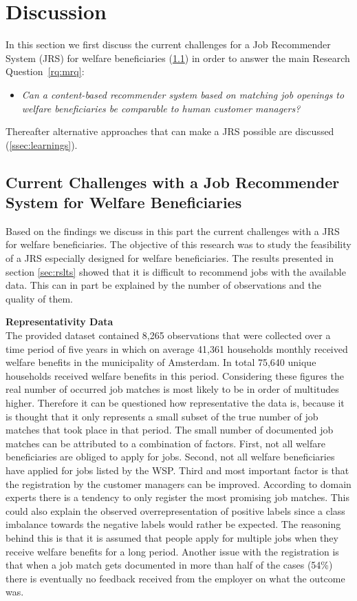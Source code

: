 \section{Discussion}
\label{sec:disc}
In this section we first discuss the current challenges for a Job Recommender System (JRS) for 
welfare beneficiaries (\ref{ssec:jrswb}) in order to answer the main Research Question~\ref{rq:mrq}: 
\begin{itemize}
	\item[] \em Can a content-based recommender system based on matching job openings to welfare beneficiaries be comparable to human customer managers?
\end{itemize}
Thereafter alternative approaches that can make a JRS possible are discussed (\ref{ssec:learnings}). 

\subsection{Current Challenges with a Job Recommender System for Welfare Beneficiaries}
\label{ssec:jrswb}
Based on the findings we discuss in this part the current challenges with a JRS for welfare beneficiaries.
The objective of this research was to study the feasibility of a JRS especially designed for welfare beneficiaries. 
The results presented in section \ref{sec:rslts} showed that it is difficult to recommend jobs with the available data.
This can in part be explained by the number of observations and the quality of them.

\noindent
\textbf{Representativity Data}\\
The provided dataset contained 8,265 observations that were collected over a time period of five years in which on average 41,361 households monthly received welfare benefits in the municipality of Amsterdam.
In total 75,640 unique households received welfare benefits in this period.
Considering these figures the real number of occurred job matches is most likely to be in order of multitudes higher.
Therefore it can be questioned how representative the data is, because it is thought that it only represents a small subset of the true number of job matches that took place in that period.  
The small number of documented job matches can be attributed to a combination of factors.
First, not all welfare beneficiaries are obliged to apply for jobs.
Second, not all welfare beneficiaries have applied for jobs listed by the WSP.
Third and most important factor is that the registration by the customer managers can be improved.
According to domain experts there is a tendency to only register the most promising job matches.
This could also explain the observed overrepresentation of positive labels since a class imbalance towards the negative labels would rather be expected.
The reasoning behind this is that it is assumed that people apply for multiple jobs when they receive welfare benefits for a long period. 
Another issue with the registration is that when a job match gets documented in more than half of the cases (54\%) there is eventually no feedback received from the employer on what the outcome was.

